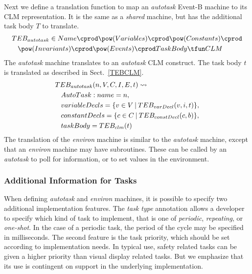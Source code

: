 Next we define a translation function to map an \emph{autotask} Event-B machine to its CLM representation. It is the same as a  \emph{shared} machine, but has the additional task body $T$ to translate. 
\begin{equation}
\begin{split}
&TEB_{autotask} \in Name \cprod \pow(Variables) \cprod \pow(Constants) \cprod\\
& \hspace*{0.3cm}\pow(Invariants) \cprod \pow(Events) \cprod TaskBody \tfun CLM
\end{split}
\notag
\end{equation}
%
The \emph{autotask} machine  translates to an \emph{autotask} CLM construct. The task body $t$ is translated as described in Sect.~\ref{TEBCLM}. 
%
\begin{equation}
\begin{split}
&TEB_{autotask}(n, V, C, I, E, t) \leadsto\\
& \hspace*{0.3cm}AutoTask: name = n, \\
& \hspace*{0.3cm}variableDecls = \{ v\in V~ \vline~  TEB_{varDecl}(v, i, t) \},\\
& \hspace*{0.3cm}constantDecls = \{ c\in C~ \vline~ TEB_{constDecl}(c, b)\},\\
&\hspace*{0.3cm} taskBody = TEB_{clm}(t)
\end{split}
\notag
\end{equation}
%
The translation of the \emph{environ} machine is similar to the \emph{autotask} machine, except that an \emph{environ} machine may have subroutines. These can be called by an \emph{autotask} to poll for information, or to set values in the environment.

\subsubsection{Additional Information for Tasks}
When defining \emph{autotask} and \emph{environ} machines, it is possible to specify two additional implementation features. The \emph{task type} annotation allows a developer to specify which kind of task to implement, that is one of \emph{periodic}, \emph{repeating}, or \emph{one-shot}. In the case of a periodic task, the period of the cycle may be specified in milliseconds. The second feature is the task priority, which should be set according to implementation needs. In typical use, safety related tasks can be given a higher priority than visual display related tasks. But we emphasize that its use is contingent on support in the underlying implementation. 

